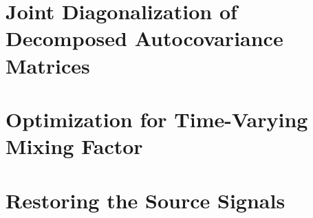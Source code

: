\documentclass[utf8,english]{gradu3}
\begin{document}
\section{Joint Diagonalization of Decomposed Autocovariance Matrices}

\section{Optimization for Time-Varying Mixing Factor}

\section{Restoring the Source Signals}


\printbibliography
\end{document}
